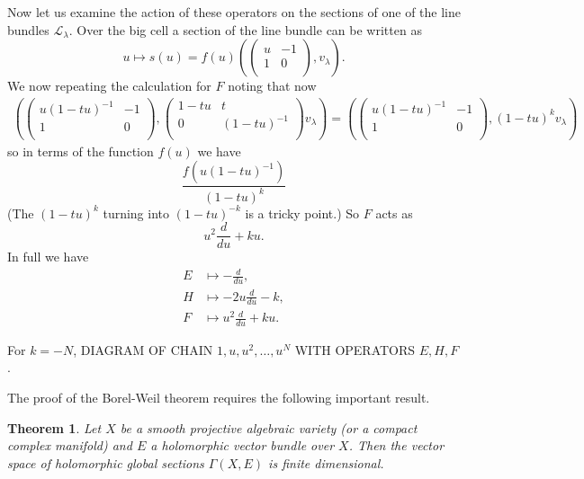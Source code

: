 \documentclass[12pt]{article}
\theoremstyle{plain}
\newtheorem{thm}{Theorem}[section]
\theoremstyle{definition}
\numberwithin{equation}{section}
\newcommand{\la}{\lambda}
\newcommand{\CL}{\mathcal{L}}
\begin{document}
Now let us examine the action of these operators on the sections of one of the line bundles $\CL_{\la}$. Over the big cell a section of the line bundle can be written as
\[
u \mapsto s(u) =  f(u) (\left(
\begin{array}{cc}
u & -1 \\
1 & 0 \\
\end{array}
\right), v_\la).
\]
We now repeating the calculation for $F$ noting that now
\begin{align*}
( \left(
\begin{array}{cc}
u(1-tu)^{-1} & -1 \\
1 & 0 \\
\end{array}
\right), \left(
\begin{array}{cc}
1-tu & t \\
0 & (1-tu)^{-1} \\
\end{array}
\right) v_\la ) = ( \left(
\begin{array}{cc}
u(1-tu)^{-1} & -1 \\
1 & 0 \\
\end{array}
\right), (1-tu)^k v_\la )
\end{align*}
so in terms of the function $f(u)$ we have
\[
\frac{f(u(1-tu)^{-1})}{(1-tu)^k}
\]
(The $(1-tu)^k$ turning into $(1-tu)^{-k}$ is a tricky point.) So $F$ acts as
\[
u^2 \frac{d}{du} + ku.
\]
In full we have
\begin{align*}
E &\mapsto -\frac{d}{du}, \\
%
H &\mapsto -2u \frac{d}{du} - k, \\
%
F &\mapsto u^2 \frac{d}{du} + ku.
\end{align*}


{\color{blue}For $k = -N$, DIAGRAM OF CHAIN $1, u, u^2, \ldots, u^{N}$ WITH OPERATORS $E, H, F$.}




The proof of the Borel-Weil theorem requires the following important result.
\begin{thm}\label{thm:finiteness.sections}
Let $X$ be a smooth projective algebraic variety (or a compact complex manifold) and $E$ a holomorphic vector bundle over $X$. Then the vector space of holomorphic global sections $\Gamma(X, E)$ is finite dimensional.
\end{thm}
\end{document}
